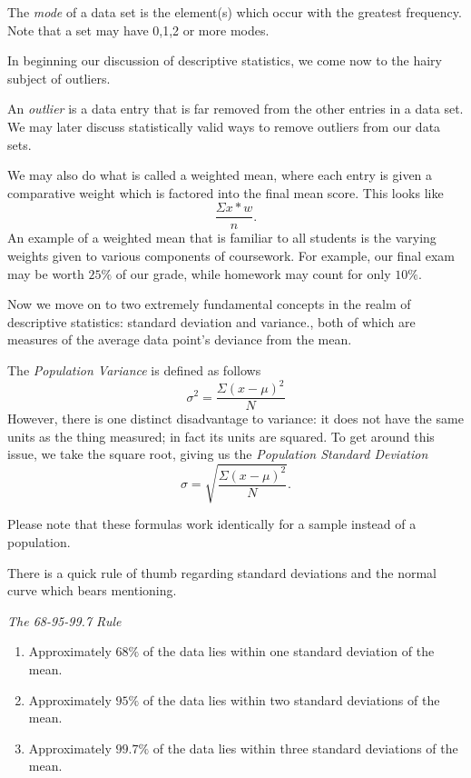 The \emph{mode} of a data set is the element(s) which occur with the greatest frequency. Note that a set may have 0,1,2 or more modes.\newline

In beginning our discussion of descriptive statistics, we come now to the hairy subject of outliers.

\begin{definition}
An \emph{outlier} is a data entry that is far removed from the other entries in a data set. We may later discuss statistically valid ways to remove outliers from our data sets.
\end{definition} 

We may also do what is called a weighted mean, where each entry is given a comparative weight which is factored into the final mean score. This looks like $$\frac{\Sigma{x * w}}{n}.$$ An example of a weighted mean that is familiar to all students is the varying weights given to various components of coursework. For example, our final exam may be worth $25\%$ of our grade, while homework may count for only $10\%.$\newline

Now we move on to two extremely fundamental concepts in the realm of descriptive statistics: standard deviation and variance., both of which are measures of the average data point's deviance from the mean.\newline

The \emph{Population Variance} is defined as follows $$\sigma^2 = \frac{\Sigma(x-\mu)^2}{N}$$ However, there is one distinct disadvantage to variance: it does not have the same units as the thing measured; in fact its units are squared. To get around this issue, we take the square root, giving us the \emph{Population Standard Deviation} $$\sigma = \sqrt{\frac{\Sigma(x-\mu)^2}{N}}.$$

Please note that these formulas work identically for a sample instead of a population.\newline

There is a quick rule of thumb regarding standard deviations and the normal curve which bears mentioning.

\begin{theorem}
	\emph{The 68-95-99.7 Rule}\newline
	\begin{enumerate}
		\item Approximately $68\%$ of the data lies within one standard deviation of the mean.
		\item Approximately $95\%$ of the data lies within two standard deviations of the mean.
		\item Approximately $99.7\%$ of the data lies within three standard deviations of the mean.
	\end{enumerate}
\end{theorem}

